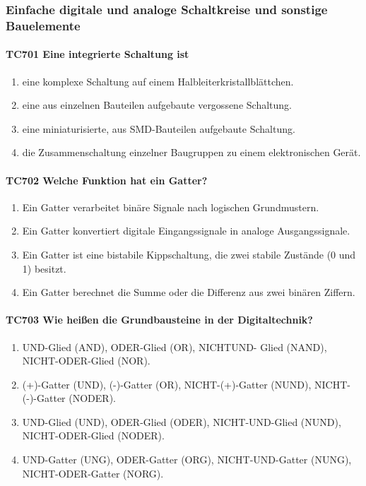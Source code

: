 \documentclass[8pt]{article}
\begin{document}
\begin{enumerate}
\begin{enumerate}[nolistsep,label=\Alph*]
{\begin{enumerate}[nolistsep,label=\Alph*]
\pagebreak
\subsubsection{Einfache digitale und analoge Schaltkreise und sonstige Bauelemente}
\paragraph*{TC701 Eine integrierte Schaltung ist}
\begin{enumerate}[nolistsep,label=\Alph*]
\item eine komplexe Schaltung auf einem Halbleiterkristallblättchen.
\item eine aus einzelnen Bauteilen aufgebaute vergossene Schaltung.
\item eine miniaturisierte, aus SMD-Bauteilen aufgebaute Schaltung.
\item die Zusammenschaltung einzelner Baugruppen zu einem elektronischen Gerät.
\end{enumerate}

\paragraph*{TC702 Welche Funktion hat ein Gatter?}
\begin{enumerate}[nolistsep,label=\Alph*]
\item Ein Gatter verarbeitet binäre Signale nach logischen Grundmustern.
\item Ein Gatter konvertiert digitale Eingangssignale in analoge Ausgangssignale.
\item Ein Gatter ist eine bistabile Kippschaltung, die zwei stabile Zustände (0 und 1) besitzt.
\item Ein Gatter berechnet die Summe oder die Differenz aus zwei binären Ziffern.
\end{enumerate}

\paragraph*{TC703 Wie heißen die Grundbausteine in der Digitaltechnik?}
\begin{enumerate}[nolistsep,label=\Alph*]
\item UND-Glied (AND), ODER-Glied (OR), NICHTUND- Glied (NAND), NICHT-ODER-Glied (NOR).
\item (+)-Gatter (UND), (-)-Gatter (OR), NICHT-(+)-Gatter (NUND), NICHT-(-)-Gatter (NODER).
\item UND-Glied (UND), ODER-Glied (ODER), NICHT-UND-Glied (NUND), NICHT-ODER-Glied (NODER).
\item UND-Gatter (UNG), ODER-Gatter (ORG), NICHT-UND-Gatter (NUNG), NICHT-ODER-Gatter (NORG).
\end{enumerate}


\end{enumerate}}
\end{enumerate}
\end{enumerate}
\end{document}
